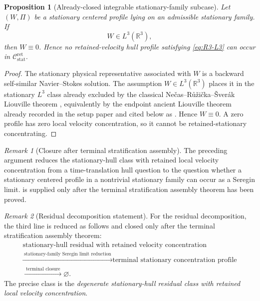 \documentclass[11pt]{amsart}
\numberwithin{equation}{section}
\theoremstyle{plain}
\newtheorem{proposition}[proposition]{Proposition}
\theoremstyle{definition}
\theoremstyle{remark}
\newtheorem{remark}[remark]{Remark}
\newcommand{\Cstat}{\mathcal C_{\mathrm{stat}}^{\mathrm{ret}}}
\begin{document}
\begin{proposition}[Already-closed integrable stationary-family subcase]
\label{prop:R3-L3-subcase}
Let \((W,\Pi)\) be a stationary centered profile lying on an admissible
stationary family.  If
\begin{equation}\label{eq:R3-L3}
   W\in L^3(\mathbb R^3),
\end{equation}
then \(W\equiv0\).  Hence no retained-velocity hull profile satisfying
\eqref{eq:R3-L3} can occur in \(\Cstat\).
\end{proposition}

\begin{proof}
The stationary physical representative associated with \(W\) is a backward
self-similar Navier--Stokes solution.  The assumption \(W\in L^3(\mathbb R^3)\)
places it in the stationary \(L^3\) class already excluded by the classical
Ne\v cas--R\r u\v zi\v cka--\v Sver\'ak Liouville theorem \cite{NRS1996},
equivalently by the endpoint ancient Liouville theorem already recorded in
the setup paper and cited below as .  Hence \(W\equiv0\).  A
zero profile has zero local velocity concentration, so it cannot be
retained-stationary concentrating.
\end{proof}

\begin{remark}[Closure after terminal stratification assembly]
\label{rem:R3-final-obligation}
The preceding argument reduces the stationary-hull class with retained local
velocity concentration from a time-translation hull question to the question whether a
stationary centered profile in a nontrivial stationary family can occur as a
Seregin limit.
 is supplied only after the
terminal stratification assembly theorem has been proved.
\end{remark}

\begin{remark}[Residual decomposition statement]
\label{rem:R3-decomposition-replacement}
For the residual decomposition, the third line is reduced as follows and closed
only after the terminal stratification assembly theorem:
\[
\begin{gathered}
   \text{stationary-hull residual with retained velocity concentration}\\
   \xrightarrow{\;\text{stationary-family Seregin limit reduction}\;}
   \text{terminal stationary concentration profile}\\
   \xrightarrow{\;\text{terminal closure}\;}
   \varnothing .
\end{gathered}
\]
The precise class is the
\emph{degenerate stationary-hull residual class with retained local
velocity concentration}.
\end{remark}
\end{document}
